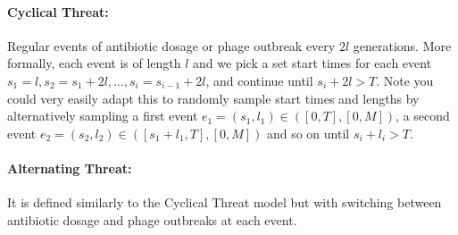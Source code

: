 \paragraph{Cyclical Threat:}
Regular events of antibiotic dosage or phage outbreak every $2l$ generations.
More formally, each event is of length $l$ and we pick a set start times for each event $s_1=l, s_2=s_1+2l,\dots, s_i=s_{i-1}+2l$, and continue until $s_i+2l > T$.
Note you could very easily adapt this to randomly sample start times and lengths by alternatively sampling a first event $e_1 = (s_1,l_1) \in ([0,T],[0,M])$, a second event $e_2 = (s_2,l_2) \in ([s_1+l_1,T],[0,M])$ and so on until $s_i+l_i > T$.
\paragraph{Alternating Threat:}
It is defined similarly to the Cyclical Threat model but with switching between antibiotic dosage and phage outbreaks at each event.

